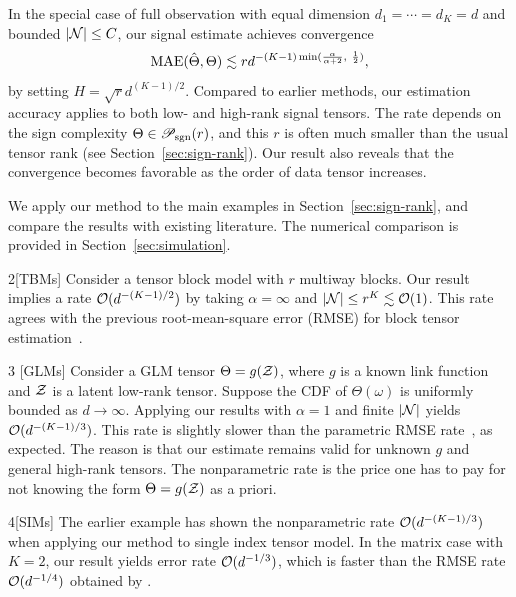 \documentclass{article}
\theoremstyle{plain}
\theoremstyle{definition}
\def\caliP{\mathscr{P}_{\textup{sgn}}}
\begin{document}
In the special case of full observation with equal dimension $d_1=\cdots=d_K=d$ and bounded $|\mathcal{N}|\leq C$, our signal estimate achieves convergence
\begin{equation}
\textup{MAE}(\hat \Theta, \Theta)\lesssim rd^{-(K-1)\min({\alpha\over \alpha+2},\ {1\over 2})},
\end{equation}
by setting $H= \sqrt{r}d^{(K-1)/2}$. Compared to earlier methods, our estimation accuracy applies to both low- and high-rank signal tensors. The rate depends on the sign complexity $\Theta\in\caliP(r)$, and this $r$ is often much smaller than the usual tensor rank (see Section~\ref{sec:sign-rank}). Our result also reveals that the convergence becomes favorable as the order of data tensor increases. 

We apply our method to the main examples in Section~\ref{sec:sign-rank}, and compare the results with existing literature. The numerical comparison is provided in Section~\ref{sec:simulation}. 

\vspace{.05cm}
\begin{customexample}{2}[TBMs]
Consider a tensor block model with $r$ multiway blocks. Our result implies a rate $\mathcal{O}(d^{-(K-1)/2})$ by taking $\alpha=\infty$ and $|\mathcal{N}| \leq r^K\lesssim \mathcal{O}(1)$. This rate agrees with the  previous root-mean-square error (RMSE) for block tensor estimation~\citep{wang2019multiway}.
\end{customexample}
\vspace{.05cm}

\begin{customexample}{3} [GLMs] 
Consider a GLM tensor $\Theta=g(\mathcal{Z})$, where $g$ is a known link function and $\mathcal{Z}$ is a latent low-rank tensor. Suppose the CDF of $\Theta(\omega)$ is uniformly bounded as $d\to\infty$. Applying our results with $\alpha=1$ and finite $|\mathcal{N}|$ yields $\mathcal{O}(d^{-(K-1)/3})$. This rate is slightly slower than the parametric RMSE rate~\citep{zhang2018tensor,wang2018learning}, as expected. The reason is that our estimate remains valid for unknown $g$ and general high-rank tensors. The nonparametric rate is the price one has to pay for not knowing the form $\Theta=g(\mathcal{Z})$ as a priori. 
\end{customexample}
\vspace{.05cm}

\begin{customexample}{4}[SIMs]
The earlier example has shown the nonparametric rate $\mathcal{O}(d^{-(K-1)/3})$ when applying our method to single index tensor model. In the matrix case with $K=2$, our result yields error rate $\mathcal{O}(d^{-1/3})$, which is faster than the RMSE rate $\mathcal{O}(d^{-1/4})$ obtained by \cite{ganti2015matrix}. 
\end{customexample}
\vspace{.05cm}
\end{document}
